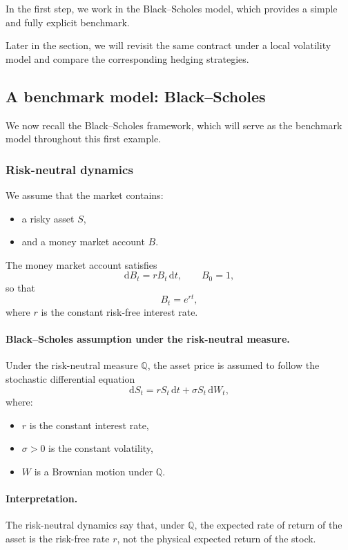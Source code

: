 \documentclass[11pt]{article}
\newcommand{\Qbb}{\mathbb{Q}}
\theoremstyle{plain}
\theoremstyle{definition}
\theoremstyle{remark}
\begin{document}
In the first step, we work in the Black--Scholes model, which provides a
simple and fully explicit benchmark.

Later in the section, we will revisit the same contract under a local
volatility model and compare the corresponding hedging strategies.

\subsection{A benchmark model: Black--Scholes}

We now recall the Black--Scholes framework, which will serve as the
benchmark model throughout this first example.

\subsubsection{Risk-neutral dynamics}

We assume that the market contains:
\begin{itemize}[leftmargin=1.4em]
    \item a risky asset \(S\),
    \item and a money market account \(B\).
\end{itemize}

The money market account satisfies
\[
\mathrm{d}B_t=rB_t\,\mathrm{d}t,
\qquad
B_0=1,
\]
so that
\[
B_t=e^{rt},
\]
where \(r\) is the constant risk-free interest rate.

\paragraph{Black--Scholes assumption under the risk-neutral measure.}
Under the risk-neutral measure \(\Qbb\), the asset price is assumed to
follow the stochastic differential equation
\[
\mathrm{d}S_t=rS_t\,\mathrm{d}t+\sigma S_t\,\mathrm{d}W_t,
\]
where:
\begin{itemize}[leftmargin=1.4em]
    \item \(r\) is the constant interest rate,
    \item \(\sigma>0\) is the constant volatility,
    \item \(W\) is a Brownian motion under \(\Qbb\).
\end{itemize}

\paragraph{Interpretation.}
The risk-neutral dynamics say that, under \(\Qbb\), the expected rate of
return of the asset is the risk-free rate \(r\), not the physical
expected return of the stock.
\end{document}
